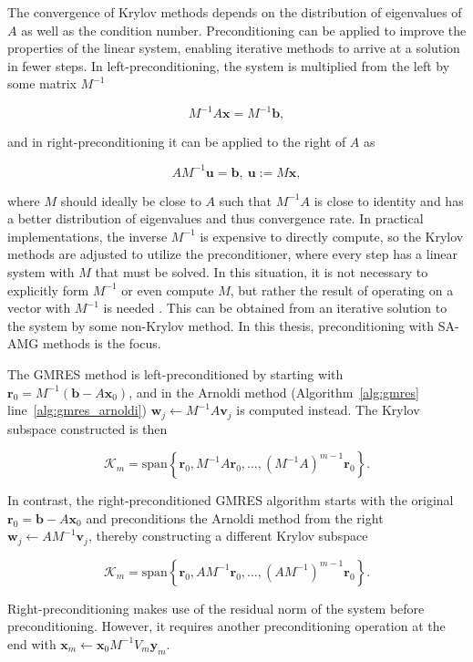 The convergence of Krylov methods depends on the distribution of eigenvalues of $A$ as well as the condition number. Preconditioning can be applied to improve the properties of the linear system, enabling iterative methods to arrive at a solution in fewer steps. In left-preconditioning, the system is multiplied from the left by some matrix $M^{-1}$

\begin{equation}
    M^{-1}A\mathbf{x} = M^{-1}\mathbf{b},
\end{equation}

and in right-preconditioning it can be applied to the right of $A$ as

\begin{equation}
    A M^{-1} \mathbf{u} = \mathbf{b},\ \mathbf{u}:= M\mathbf{x},
\end{equation}

where $M$ should ideally be close to $A$ such that $M^{-1}A$ is close to identity and has a better distribution of eigenvalues and thus convergence rate. In practical implementations, the inverse $M^{-1}$ is expensive to directly compute, so the Krylov methods are adjusted to utilize the preconditioner, where every step has a linear system with $M$ that must be solved. In this situation, it is not necessary to explicitly form $M^{-1}$ or even compute $M$, but rather the result of operating on a vector with $M^{-1}$ is needed \cite{Shewchuk1994}. This can be obtained from an iterative solution to the system by some non-Krylov method. In this thesis, preconditioning with SA-AMG methods is the focus.

The GMRES method is left-preconditioned by starting with $\mathbf{r}_0 = M^{-1}(\mathbf{b}-A\mathbf{x}_0)$, and in the Arnoldi method (Algorithm~\ref{alg:gmres} line~\ref{alg:gmres_arnoldi}) $\mathbf{w}_j \gets M^{-1}A\mathbf{v}_j$ is computed instead. The Krylov subspace constructed is then

\begin{equation}
    \mathcal{K}_m = \text{span}\left\{\mathbf{r}_0, M^{-1}A\mathbf{r}_0, \ldots, \left(M^{-1}A\right)^{m-1}\mathbf{r}_0\right\}.
\end{equation}

In contrast, the right-preconditioned GMRES algorithm starts with the original $\mathbf{r}_0 = \mathbf{b} - A\mathbf{x}_0$ and preconditions the Arnoldi method from the right $\mathbf{w}_j \gets AM^{-1}\mathbf{v}_j$, thereby constructing a different Krylov subspace

\begin{equation}
    \mathcal{K}_m = \text{span}\left\{\mathbf{r}_0, AM^{-1}\mathbf{r}_0, \ldots, \left(AM^{-1}\right)^{m-1}\mathbf{r}_0\right\}.
\end{equation}

Right-preconditioning makes use of the residual norm of the system before preconditioning. However, it requires another preconditioning operation at the end with $\mathbf{x}_m \gets \mathbf{x}_0 M^{-1}V_m \mathbf{y}_m$.

